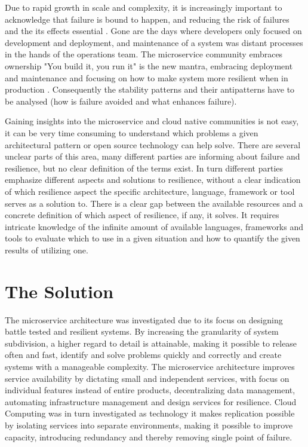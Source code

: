 Due to rapid growth in scale and complexity, it is increasingly important to acknowledge that failure is bound to happen, and reducing the risk of failures and the its effects essential \cite{abid2014toward} \cite[p. 117]{nygard2007release} \cite{tseitlin2013antifragile} \cite{krishnan2012weathering}. Gone are the days where developers only focused on development and deployment, and maintenance of a system was distant processes in the hands of the operations team. The microservice community embraces ownership "You build it, you run it" \cite{gray2006conversation} is the new mantra, embracing deployment and maintenance and focusing on how to make system more resilient when in production \cite[p.~6]{nygard2007release}. Consequently the stability patterns and their antipatterns have to be analysed (how is failure avoided and what enhances failure).

Gaining insights into the microservice and cloud native communities is not easy, it can be very time consuming to understand which problems a given architectural pattern or open source technology can help solve. There are several unclear parts of this area, many different parties are informing about failure and resilience, but no clear definition of the terms exist. In turn different parties emphasize different aspects and solutions to resilience, without a clear indication of which resilience aspect the specific architecture, language, framework or tool serves as a solution to. There is a clear gap between the available resources and a concrete definition of which aspect of resilience, if any, it solves. It requires intricate knowledge of the infinite amount of available languages, frameworks and tools to evaluate which to use in a given situation and how to quantify the given results of utilizing one.



\section{The Solution}
The microservice architecture was investigated due to its focus on designing battle tested and resilient systems. By increasing the granularity of system subdivision, a higher regard to detail is attainable, making it possible to release often and fast, identify and solve problems quickly and correctly and create systems with a manageable complexity. The microservice architecture improves service availability by dictating small and independent services, with focus on individual features instead of entire products, decentralizing data management, automating infrastructure management and design services for resilience. Cloud Computing was in turn investigated as technology it makes replication possible by isolating services into separate environments, making it possible to improve capacity, introducing redundancy and thereby removing single point of failure. 

